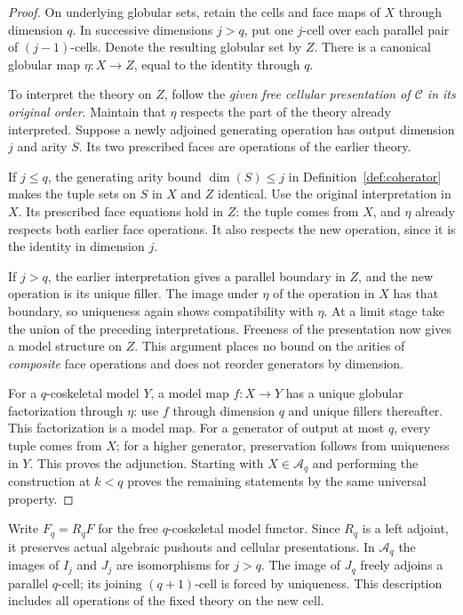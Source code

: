 \documentclass[11pt,letterpaper]{article}
\numberwithin{equation}{section}
\theoremstyle{plain}
\theoremstyle{definition}
\theoremstyle{remark}
\begin{document}
\begin{proof}
On underlying globular sets, retain the cells and face maps of $X$
through dimension $q$.  In successive dimensions $j>q$, put one
$j$-cell over each parallel pair of $(j-1)$-cells.  Denote the resulting
globular set by $Z$.  There is a canonical globular map $\eta:X\to Z$,
equal to the identity through $q$.

To interpret the theory on $Z$, follow the \emph{given free cellular
presentation of $\mathcal C$ in its original order}.  Maintain that
$\eta$ respects the part of the theory already interpreted.  Suppose
a newly adjoined generating operation has output dimension $j$ and
arity $S$.  Its two prescribed faces are operations of the earlier
theory.

If $j\leq q$, the generating arity bound
$\dim(S)\leq j$ in Definition~\ref{def:coherator} makes the tuple sets
on $S$ in $X$ and $Z$ identical.  Use the original interpretation in
$X$.  Its prescribed face equations hold in $Z$: the tuple comes
from $X$, and $\eta$ already respects both earlier face operations.
It also respects the new operation, since it is the identity in
dimension $j$.

If $j>q$, the earlier interpretation gives a parallel boundary in
$Z$, and the new operation is its unique filler.  The image under
$\eta$ of the operation in $X$ has that boundary, so uniqueness again
shows compatibility with $\eta$.  At a limit stage take the union of
the preceding interpretations.  Freeness of the presentation now
gives a model structure on $Z$.  This argument places no bound on
the arities of \emph{composite} face operations and does not reorder
generators by dimension.

For a $q$-coskeletal model $Y$, a model map $f:X\to Y$ has a unique
globular factorization through $\eta$: use $f$ through dimension $q$
and unique fillers thereafter.  This factorization is a model map.
For a generator of output at most $q$, every tuple comes from $X$;
for a higher generator, preservation follows from uniqueness in
$Y$.  This proves the adjunction.  Starting with $X\in\mathcal A_q$
and performing the construction at $k<q$ proves the remaining
statements by the same universal property.
\end{proof}

Write $F_q=R_qF$ for the free $q$-coskeletal model functor.  Since
$R_q$ is a left adjoint, it preserves actual algebraic pushouts and
cellular presentations.  In $\mathcal A_q$ the images of $I_j$ and
$J_j$ are isomorphisms for $j>q$.  The image of $J_q$ freely adjoins
a parallel $q$-cell; its joining $(q+1)$-cell is forced by uniqueness.
This description includes all operations of the fixed theory on the
new cell.
\end{document}
